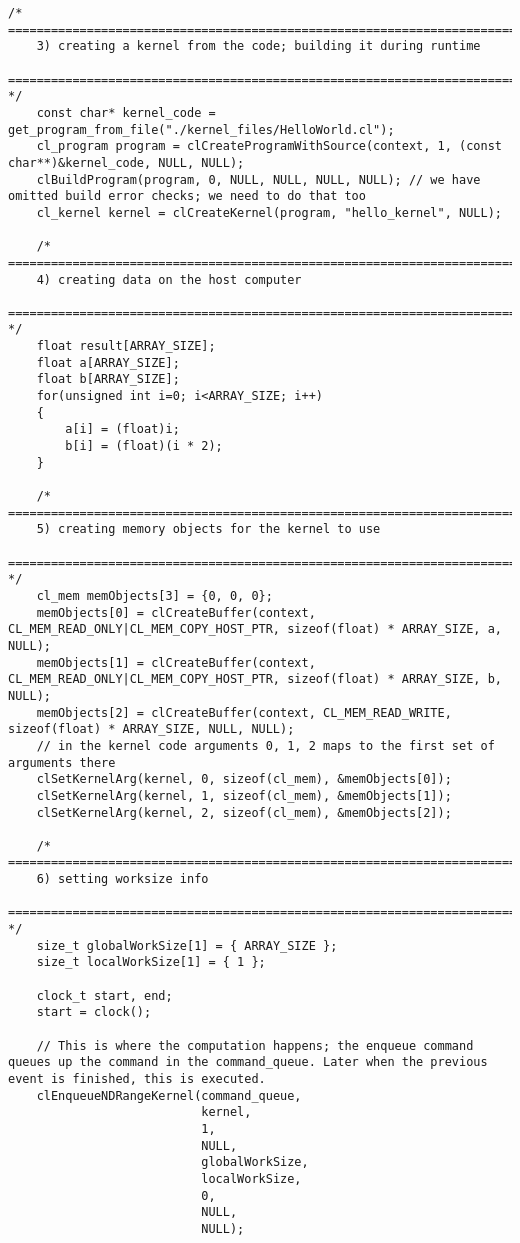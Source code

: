 \begin{mdframed}[roundcorner=10pt, backgroundcolor=backgroundgray, outerlinewidth=2]
\begin{lstlisting}[frame=none]
	/* =======================================================================================================
	3) creating a kernel from the code; building it during runtime
	======================================================================================================= */
	const char* kernel_code = get_program_from_file("./kernel_files/HelloWorld.cl");
	cl_program program = clCreateProgramWithSource(context, 1, (const char**)&kernel_code, NULL, NULL);
	clBuildProgram(program, 0, NULL, NULL, NULL, NULL); // we have omitted build error checks; we need to do that too
    cl_kernel kernel = clCreateKernel(program, "hello_kernel", NULL);

	/* =======================================================================================================
	4) creating data on the host computer
	======================================================================================================= */
    float result[ARRAY_SIZE];
    float a[ARRAY_SIZE];
    float b[ARRAY_SIZE];
    for(unsigned int i=0; i<ARRAY_SIZE; i++)
    {
        a[i] = (float)i;
        b[i] = (float)(i * 2);
    }

	/* =======================================================================================================
	5) creating memory objects for the kernel to use
	======================================================================================================= */
    cl_mem memObjects[3] = {0, 0, 0};
    memObjects[0] = clCreateBuffer(context, CL_MEM_READ_ONLY|CL_MEM_COPY_HOST_PTR, sizeof(float) * ARRAY_SIZE, a, NULL);
    memObjects[1] = clCreateBuffer(context, CL_MEM_READ_ONLY|CL_MEM_COPY_HOST_PTR, sizeof(float) * ARRAY_SIZE, b, NULL);
    memObjects[2] = clCreateBuffer(context, CL_MEM_READ_WRITE, sizeof(float) * ARRAY_SIZE, NULL, NULL);
	// in the kernel code arguments 0, 1, 2 maps to the first set of arguments there
    clSetKernelArg(kernel, 0, sizeof(cl_mem), &memObjects[0]);
    clSetKernelArg(kernel, 1, sizeof(cl_mem), &memObjects[1]);
    clSetKernelArg(kernel, 2, sizeof(cl_mem), &memObjects[2]);

	/* =======================================================================================================
	6) setting worksize info
	======================================================================================================= */
    size_t globalWorkSize[1] = { ARRAY_SIZE };
    size_t localWorkSize[1] = { 1 };
	
    clock_t start, end; 
    start = clock(); 

	// This is where the computation happens; the enqueue command queues up the command in the command_queue. Later when the previous event is finished, this is executed.
    clEnqueueNDRangeKernel(command_queue, 
						   kernel, 
						   1, 
						   NULL, 
						   globalWorkSize, 
						   localWorkSize, 
						   0, 
						   NULL, 
						   NULL);


\end{lstlisting}
\end{mdframed}

